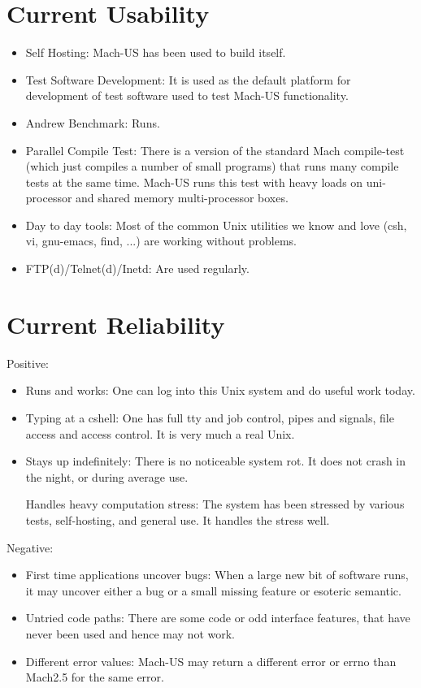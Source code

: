 \section{Current Usability}
\begin{itemize}
\item{Self Hosting}: Mach-US has been used to build itself.

\item{Test Software Development}: It is used as the default platform for
development of test software used to test Mach-US functionality.

\item{Andrew Benchmark}:  Runs.

\item{Parallel Compile Test}:  There is a version of the standard Mach compile-test
(which just compiles a number of small programs) that runs many compile tests
at the same time.  Mach-US runs this test with heavy loads on uni-processor
and shared memory multi-processor boxes.  

\item{Day to day tools}: Most of the common Unix utilities we know and love
(csh, vi, gnu-emacs, find, ...) are working without problems.

\item{FTP(d)/Telnet(d)/Inetd}: Are used regularly.
\end{itemize}
\section{Current Reliability}
Positive:
\begin{itemize}
\item{Runs and works}: One can log into this Unix system and 
do useful work today.

\item{Typing at a cshell}: One has full tty and job control,
pipes and signals, file access and access control.
It is very much a real Unix.

\item{Stays up indefinitely}:
There is no noticeable system rot.  It does not crash
in the night, or during average use.

Handles heavy computation stress:  The system has been stressed by various
tests, self-hosting, and general use.  It handles the stress well.
\end{itemize}

Negative:
\begin{itemize}
\item{First time applications uncover bugs}:  When a large new bit of software
runs, it may uncover either a bug or a small missing feature or
esoteric semantic.

\item{Untried code paths}:  There are some code or odd interface features,
that have never been used and hence may not work.

\item{Different error values}: Mach-US may return a different error or errno
than Mach2.5 for the same error.
\end{itemize}

